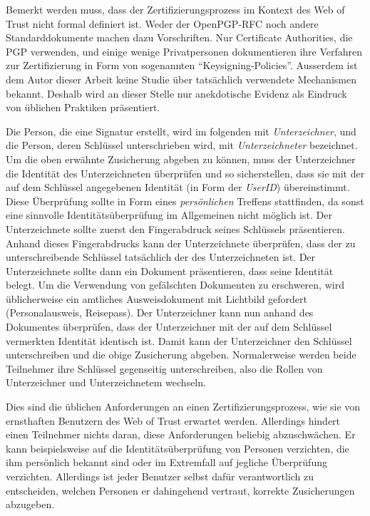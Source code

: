 Bemerkt werden muss, dass der Zertifizierungsprozess im Kontext des
Web of Trust nicht formal definiert ist. Weder der OpenPGP-RFC noch
andere Standarddokumente machen dazu Vorschriften. Nur Certificate
Authorities, die PGP verwenden, und einige wenige Privatpersonen
dokumentieren ihre Verfahren zur Zertifizierung in Form von
sogenannten ``Keysigning-Policies''. Ausserdem ist dem Autor dieser
Arbeit keine Studie \"uber tats\"achlich verwendete Mechanismen
bekannt. Deshalb wird an dieser Stelle nur anekdotische Evidenz
als Eindruck von \"ublichen Praktiken pr\"asentiert.

Die Person, die eine Signatur erstellt, wird im folgenden mit
\emph{Unterzeichner}, und die Person, deren Schl\"ussel
unterschrieben wird, mit \emph{Unterzeichneter} bezeichnet. Um
die oben erw\"ahnte Zusicherung abgeben zu k\"onnen, muss der
Unterzeichner die Identit\"at des Unterzeichneten \"uberpr\"ufen und
so sicherstellen, dass sie mit der auf dem Schl\"ussel angegebenen
Identit\"at (in Form der \emph{UserID}) \"ubereinstimmt. Diese
\"Uberpr\"ufung sollte in Form eines \emph{pers\"onlichen} Treffens
stattfinden, da sonst eine sinnvolle Identit\"ats\"uberpr\"ufung im
Allgemeinen nicht m\"oglich ist. Der Unterzeichnete sollte zuerst den
Fingerabdruck seines Schl\"ussels pr\"asentieren. Anhand dieses
Fingerabdrucks kann der Unterzeichnete \"uberpr\"ufen, dass der zu
unterschreibende Schl\"ussel tats\"achlich der des Unterzeichneten
ist.  Der Unterzeichnete sollte dann ein Dokument pr\"asentieren, dass
seine Identit\"at belegt. Um die Verwendung von gef\"alschten
Dokumenten zu erschweren, wird \"ublicherweise ein amtliches
Ausweisdokument mit Lichtbild gefordert (Personalausweis,
Reisepass). Der Unterzeichner kann nun anhand des Dokumentes
\"uberpr\"ufen, dass der Unterzeichner mit der auf dem Schl\"ussel
vermerkten Identit\"at identisch ist. Damit kann der Unterzeichner den
Schl\"ussel unterschreiben und die obige Zusicherung
abgeben. Normalerweise werden beide Teilnehmer ihre Schl\"ussel
gegenseitig unterschreiben, also die Rollen von Unterzeichner und
Unterzeichnetem wechseln.

Dies sind die \"ublichen Anforderungen an einen
Zertifizierungsprozess, wie sie von ernsthaften Benutzern des Web of
Trust erwartet werden. Allerdings hindert einen Teilnehmer nichts
daran, diese Anforderungen beliebig abzuschw\"achen. Er kann
beispielsweise auf die Identit\"ats\"uberpr\"ufung von Personen
verzichten, die ihm pers\"onlich bekannt sind oder im Extremfall auf
jegliche \"Uberpr\"ufung verzichten. Allerdings ist jeder Benutzer
selbst daf\"ur verantwortlich zu entscheiden, welchen Personen er
dahingehend vertraut, korrekte Zusicherungen abzugeben.

